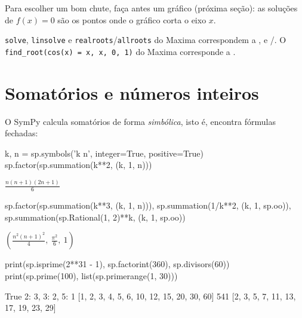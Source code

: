 \begin{dica}
Para escolher um bom chute, faça antes um gráfico (próxima seção): as soluções de $f(x)=0$ são os pontos onde o
gráfico corta o eixo $x$.
\end{dica}

\begin{maxima}
\texttt{solve}, \texttt{linsolve} e \texttt{realroots}/\texttt{allroots} do Maxima correspondem a ,
 e /. O \texttt{find\_root(cos(x) = x, x, 0, 1)} do
Maxima corresponde a .
\end{maxima}

\section{Somatórios e números inteiros}

O SymPy calcula somatórios de forma \emph{simbólica}, isto é, encontra fórmulas fechadas:

\begin{entrada}
k, n = sp.symbols('k n', integer=True, positive=True)
sp.factor(sp.summation(k**2, (k, 1, n)))
\end{entrada}
\begin{saidamat}
$\displaystyle \frac{n \left(n + 1\right) \left(2 n + 1\right)}{6}$
\end{saidamat}

\begin{entrada}
sp.factor(sp.summation(k**3, (k, 1, n))), sp.summation(1/k**2, (k, 1, sp.oo)), sp.summation(sp.Rational(1, 2)**k, (k, 1, sp.oo))
\end{entrada}
\begin{saidamat}
$\displaystyle \left( \frac{n^{2} \left(n + 1\right)^{2}}{4}, \  \frac{\pi^{2}}{6}, \  1\right)$
\end{saidamat}

\begin{entrada}
print(sp.isprime(2**31 - 1), sp.factorint(360), sp.divisors(60))
print(sp.prime(100), list(sp.primerange(1, 30)))
\end{entrada}
\begin{saida}
True {2: 3, 3: 2, 5: 1} [1, 2, 3, 4, 5, 6, 10, 12, 15, 20, 30, 60]
541 [2, 3, 5, 7, 11, 13, 17, 19, 23, 29]
\end{saida}

